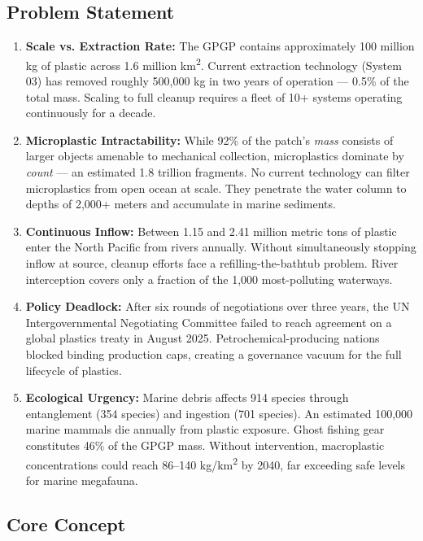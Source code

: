 \documentclass[11pt,letterpaper]{article}
\begin{document}
\subsection{Problem Statement}

\begin{enumerate}[leftmargin=2em]
\item \textbf{Scale vs. Extraction Rate:} The GPGP contains approximately 100 million kg of plastic across 1.6 million km\textsuperscript{2}. Current extraction technology (System 03) has removed roughly 500,000 kg in two years of operation --- 0.5\% of the total mass. Scaling to full cleanup requires a fleet of 10+ systems operating continuously for a decade.

\item \textbf{Microplastic Intractability:} While 92\% of the patch's \emph{mass} consists of larger objects amenable to mechanical collection, microplastics dominate by \emph{count} --- an estimated 1.8 trillion fragments. No current technology can filter microplastics from open ocean at scale. They penetrate the water column to depths of 2,000+ meters and accumulate in marine sediments.

\item \textbf{Continuous Inflow:} Between 1.15 and 2.41 million metric tons of plastic enter the North Pacific from rivers annually. Without simultaneously stopping inflow at source, cleanup efforts face a refilling-the-bathtub problem. River interception covers only a fraction of the 1,000 most-polluting waterways.

\item \textbf{Policy Deadlock:} After six rounds of negotiations over three years, the UN Intergovernmental Negotiating Committee failed to reach agreement on a global plastics treaty in August 2025. Petrochemical-producing nations blocked binding production caps, creating a governance vacuum for the full lifecycle of plastics.

\item \textbf{Ecological Urgency:} Marine debris affects 914 species through entanglement (354 species) and ingestion (701 species). An estimated 100,000 marine mammals die annually from plastic exposure. Ghost fishing gear constitutes 46\% of the GPGP mass. Without intervention, macroplastic concentrations could reach 86--140 kg/km\textsuperscript{2} by 2040, far exceeding safe levels for marine megafauna.
\end{enumerate}

\subsection{Core Concept}
\end{document}
